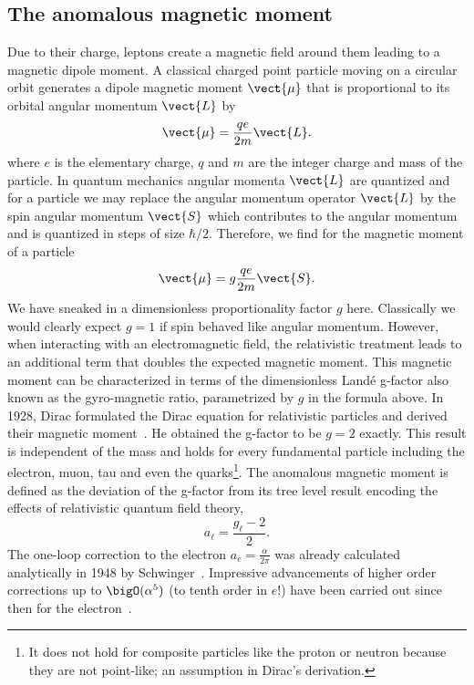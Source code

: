 \subsection{The anomalous magnetic moment}

Due to their charge, leptons create a magnetic field around them leading to a magnetic dipole moment.
A classical charged point particle moving on a circular orbit generates a dipole magnetic moment $\vect{\mu}$ that is proportional to its orbital angular momentum $\vect{L}$ by
\begin{equation}
\vect{\mu} = \frac{q e}{2 m} \vect{L}.
\end{equation}
where $e$ is the elementary charge, $q$ and $m$ are the integer charge and mass of the particle.
In quantum mechanics angular momenta $\vect{L}$ are quantized and for a \spinhalf particle we may replace the angular momentum operator $\vect{L}$ by the spin angular momentum $\vect{S}$ which contributes to the angular momentum and is quantized in steps of size $\hbar/2$.
Therefore, we find for the magnetic moment of a \spinhalf particle
\begin{equation}
\vect{\mu} = g \frac{q e}{2 m} \vect{S}.
\end{equation}
We have sneaked in a dimensionless proportionality factor $g$ here.
Classically we would clearly expect $g=1$ if spin behaved like angular momentum.
However, when interacting with an electromagnetic field, the relativistic treatment leads to an additional term that doubles the expected magnetic moment.
This magnetic moment can be characterized in terms of the dimensionless Landé g-factor also known as the gyro-magnetic ratio, parametrized by $g$ in the formula above.
In 1928, Dirac formulated the Dirac equation for relativistic \spinhalf particles and derived their magnetic moment~\cite{dirac1928quantum}.
He obtained the g-factor to be $g=2$ exactly.
This result is independent of the mass and holds for every fundamental \spinhalf particle including the electron, muon, tau and even the quarks\footnote{It does not hold for composite \spinhalf particles like the proton or neutron because they are not point-like; an assumption in Dirac's derivation.}.
The anomalous magnetic moment is defined as the deviation of the g-factor from its tree level result encoding the effects of relativistic quantum field theory,
\begin{equation}
a_{\ell} = \frac{g_{\ell}-2}{2}.
\end{equation}
The one-loop correction to the electron $a_{e} = \frac{\alpha}{2 \pi}$ was already calculated analytically in 1948 by Schwinger~\cite{Schwinger:1948}.
Impressive advancements of higher order corrections up to $\bigO(\alpha^{5})$ (\ie to tenth order in $e$!) have been carried out since then for the electron~\cite{laporta1996analytical,PhysRevLett.109.111807,PhysRevD.91.033006,nio2015qed}.

